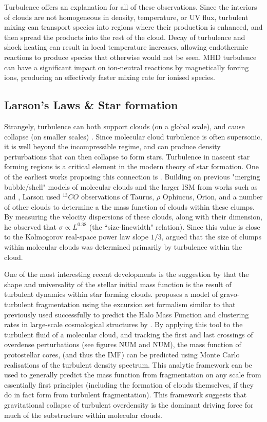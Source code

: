 \documentclass[12pt, preprint]{aastex}
\begin{document}
Turbulence offers an explanation for all of these observations.  Since the
interiors of clouds are not homogeneous in density, temperature, or UV flux,
turbulent mixing can transport species into regions where their production is
enhanced, and then spread the products into the rest of the cloud.  Decay of
turbulence and shock heating can result in local temperature increases, allowing 
endothermic reactions to produce species that otherwise would not be 
seen\citep{xie1995}.  MHD turbulence
can have a significant impact on ion-neutral reactions by magnetically forcing
ions, producing an effectively faster mixing rate for ionised species.
\subsection{Larson's Laws \& Star formation}
Strangely, turbulence can both support clouds (on a global scale), and cause
collapse (on smaller scales) \citep{mac2004}.  Since molecular cloud
turbulence is often supersonic, it is well beyond the incompressible regime,
and can produce density perturbations that can then collapse to form
stars\citep{elm2004}. Turbulence in nascent star forming 
regions is a critical element in the modern theory 
of star formation. One of the earliest works proposing this connection is
\citet{larson1981}.  Building on previous "merging bubble/shell" models of
molecular clouds and the larger ISM from works such as \citet{norman1980} and
\citet{mckee1977}, Larson used $^{13}CO$ observations of Taurus, $\rho$
Ophiucus, Orion, and a number of other clouds to determine a the mass function
of clouds within these clumps.  By measuring the velocity dispersions of these
clouds, along with their dimension, he observed that $\sigma \propto L^{0.38}$
(the ``size-linewidth" relation).  Since this value is close to the Kolmogorov
real-space power law slope $1/3$, \citet{larson1981} argued that the size of
clumps within molecular clouds was determined primarily by turbulence within
the cloud.

One of the most interesting recent developments is the suggestion by
\citet{hopk2013} that the
shape and universality of the stellar initial mass function is the result of 
turbulent dynamics within
star forming clouds. \citet{hopk2013} proposes a model of gravo-turbulent
fragmentation using the excursion set formalism similar to that previously used 
successfully to predict the Halo Mass Function and clustering rates in
large-scale cosmological structures by \citet{press1974}.  By applying this tool
to the turbulent fluid of a molecular cloud, and tracking the first and last
crossings of overdense perturbations (see figures NUM and NUM), the mass function of
protostellar cores, (and thus the IMF) can be predicted using Monte Carlo
realisations of the turbulent density spectrum.  This analytic framework
can be used to generally predict the mass function from fragmentation
on any scale from essentially first principles (including the formation 
of clouds themselves, if they do in fact
form from turbulent fragmentation).  This framework suggests that gravitational
collapse of turbulent overdensity is the dominant driving force for much of the
substructure within molecular clouds.
\end{document}
